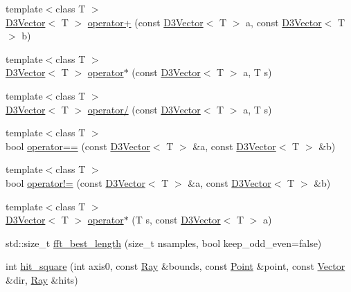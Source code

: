 \begin{DoxyCompactItemize}
\item 
{\footnotesize template$<$class T $>$ }\\\hyperlink{class_wire_cell_1_1_d3_vector}{D3\+Vector}$<$ T $>$ \hyperlink{namespace_wire_cell_a75ea0ed7ca0e2da14f517e19859dffce}{operator+} (const \hyperlink{class_wire_cell_1_1_d3_vector}{D3\+Vector}$<$ T $>$ a, const \hyperlink{class_wire_cell_1_1_d3_vector}{D3\+Vector}$<$ T $>$ b)
\item 
{\footnotesize template$<$class T $>$ }\\\hyperlink{class_wire_cell_1_1_d3_vector}{D3\+Vector}$<$ T $>$ \hyperlink{namespace_wire_cell_a5d9245915d1907fcf860d6e9000c8ba6}{operator$\ast$} (const \hyperlink{class_wire_cell_1_1_d3_vector}{D3\+Vector}$<$ T $>$ a, T s)
\item 
{\footnotesize template$<$class T $>$ }\\\hyperlink{class_wire_cell_1_1_d3_vector}{D3\+Vector}$<$ T $>$ \hyperlink{namespace_wire_cell_ac706a053d10f25428cb3c69160898918}{operator/} (const \hyperlink{class_wire_cell_1_1_d3_vector}{D3\+Vector}$<$ T $>$ a, T s)
\item 
{\footnotesize template$<$class T $>$ }\\bool \hyperlink{namespace_wire_cell_aff8585dbd31c8ec84c1c50f12b1a54d7}{operator==} (const \hyperlink{class_wire_cell_1_1_d3_vector}{D3\+Vector}$<$ T $>$ \&a, const \hyperlink{class_wire_cell_1_1_d3_vector}{D3\+Vector}$<$ T $>$ \&b)
\item 
{\footnotesize template$<$class T $>$ }\\bool \hyperlink{namespace_wire_cell_a476efb88c97bef8a48b8fe026ea65ee7}{operator!=} (const \hyperlink{class_wire_cell_1_1_d3_vector}{D3\+Vector}$<$ T $>$ \&a, const \hyperlink{class_wire_cell_1_1_d3_vector}{D3\+Vector}$<$ T $>$ \&b)
\item 
{\footnotesize template$<$class T $>$ }\\\hyperlink{class_wire_cell_1_1_d3_vector}{D3\+Vector}$<$ T $>$ \hyperlink{namespace_wire_cell_a11f3548ef97b8c9fa535c1a32937b9e2}{operator$\ast$} (T s, const \hyperlink{class_wire_cell_1_1_d3_vector}{D3\+Vector}$<$ T $>$ a)
\item 
std\+::size\+\_\+t \hyperlink{namespace_wire_cell_abb6bcae83d0f22d52565724179e9dcd8}{fft\+\_\+best\+\_\+length} (size\+\_\+t nsamples, bool keep\+\_\+odd\+\_\+even=false)
\item 
int \hyperlink{namespace_wire_cell_afb58116c2d5bbe14b5e798ca39caaa48}{hit\+\_\+square} (int axis0, const \hyperlink{namespace_wire_cell_a3ab20d9b438feb7eb1ffaab9ba98af0c}{Ray} \&bounds, const \hyperlink{namespace_wire_cell_ab2b2565fa6432efbb4513c14c988cda9}{Point} \&point, const \hyperlink{namespace_wire_cell_aa3c82d3ba85f032b0d278b7004846800}{Vector} \&dir, \hyperlink{namespace_wire_cell_a3ab20d9b438feb7eb1ffaab9ba98af0c}{Ray} \&hits)

\end{DoxyCompactItemize}
